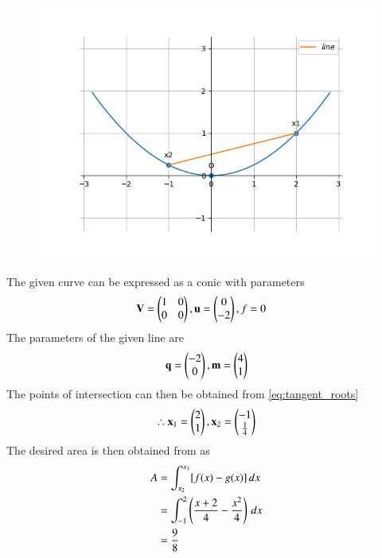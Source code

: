 	\begin{figure}[!h]
		\centering
 \includegraphics[width=\columnwidth]{chapters/12/8/1/10/figs/conic.png}
		\caption{}
		\label{fig:12/8/1/10}
  	\end{figure}
The given curve  can be expressed as a conic with parameters
\begin{align}
	\mathbf{V} &= \begin{pmatrix}1 & 0\\0 & 0\end{pmatrix}, \mathbf{u} = \begin{pmatrix}0 \\-2\end{pmatrix}, f = 0
	\end{align}
The parameters of the given line are
\begin{align}
\mathbf{q} = \begin{pmatrix}-2 \\0\end{pmatrix} , \mathbf{m}=\begin{pmatrix}4\\1\end{pmatrix}
\end{align}
The points of intersection can then be obtained from \eqref{eq:tangent_roots} 
\begin{align}
\therefore \mathbf{x}_1=\begin{pmatrix}2\\1\end{pmatrix} , \mathbf{x}_2=\begin{pmatrix}-1\\ \frac{1}{4}\end{pmatrix}
\end{align}
The desired area is then obtained 
from 		
as
\begin{align}
	A&=\int_{x_2}^{x_1} [f(x)-g(x)] \,dx
	\\
	&=\int_{-1}^{2} \left(\frac{x+2}{4}-\frac{x^2}{4}\right) \,dx
	\\
	& = \frac{9}{8} 
\end{align}

